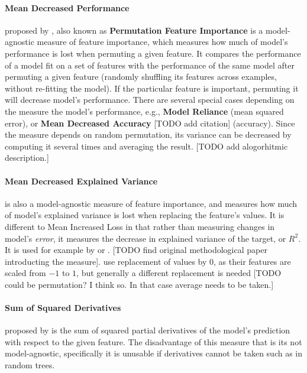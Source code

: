 {			\paragraph{Mean Decreased Performance} proposed by \citep{fisher2019all}, also known as \textbf{Permutation Feature Importance} is a model-agnostic measure of feature importance, which measures how much of model's performance is lost when permuting a given feature. It compares the performance of a model fit on a set of features with the performance of the same model after permuting a given feature (randomly shuffling its features across examples, without re-fitting the model). If the particular feature is important, permuting it will decrease model's performance. There are several special cases depending on the measure the model's performance, e.g., \textbf{Model Reliance} \citep{fisher2019all} (mean squared error), or \textbf{Mean Decreased Accuracy} [TODO add citation] (accuracy). Since the measure depends on random permutation, its variance can be decreased by computing it several times and averaging the result. [TODO add alogorhitmic description.]	
			
			\paragraph{Mean Decreased Explained Variance} is also a model-agnostic measure of feature importance, and measures how much of model's explained variance is lost when replacing the feature's values.  It is different to Mean Increased Loss in that rather than measuring changes in model's \textit{error}, it measures the decrease in explained variance of the target, or $R^2$. It is used for example by \cite{gu2020empirical} or \cite{kelly2019characteristics}. [TODO find original methodological paper introducting the measure].  \cite{gu2020empirical} use replacement of values by 0, as their features are scaled from $-1$ to $1$, but generally a different replacement is needed [TODO could be permutation? I think so. In that case average needs to be taken.]
			
			\paragraph{Sum of Squared Derivatives} proposed by \cite{dimopoulos1995use} is the sum of squared partial derivatives of the model's prediction with respect to the given feature. The disadvantage of this measure that is its not model-agnostic, specifically it is unusable if derivatives cannot be taken such as in random trees. 
			
}
